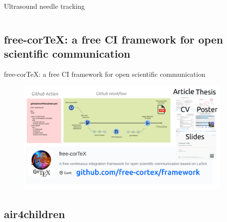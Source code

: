 {\begin{frame}{Ultrasound needle tracking}
\begin{columns}
\end{columns}

\end{frame}
}



\subsection{free-corTeX: a free CI framework for open scientific communication}
{

\begin{frame}{
free-corTeX: a free CI framework for open scientific communication
}

      \begin{figure}
        \centering
        \includegraphics[width=0.95\textwidth]{./figs/free-cortex/versions/drawing-v01.png}
      \end{figure}

\end{frame}
}


\subsection{air4children}

